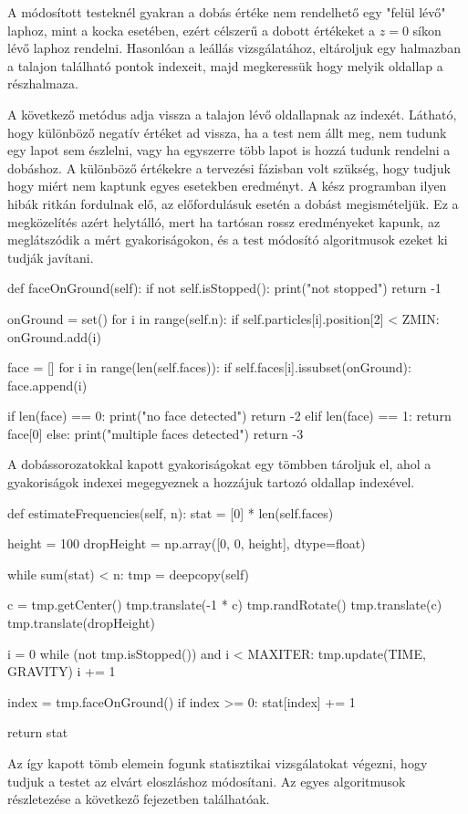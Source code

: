 
A módosított testeknél gyakran a dobás értéke nem rendelhető egy "felül lévő" laphoz, mint a kocka esetében, ezért célszerű a dobott értékeket a $z=0$ síkon lévő laphoz rendelni.
Hasonlóan a leállás vizsgálatához, eltároljuk egy halmazban a talajon található pontok indexeit, majd megkeressük hogy melyik oldallap a részhalmaza.

A következő metódus adja vissza a talajon lévő oldallapnak az indexét.
Látható, hogy különböző negatív értéket ad vissza, ha a test nem állt meg, nem tudunk egy lapot sem észlelni, vagy ha egyszerre több lapot is hozzá tudunk rendelni a dobáshoz.
A különböző értékekre a tervezési fázisban volt szükség, hogy tudjuk hogy miért nem kaptunk egyes esetekben eredményt.
A kész programban ilyen hibák ritkán fordulnak elő, az előfordulásuk esetén a dobást megismételjük.
Ez a megközelítés azért helytálló, mert ha tartósan rossz eredményeket kapunk, az meglátszódik a mért gyakoriságokon, és a test módosító algoritmusok ezeket ki tudják javítani.

\begin{python}
def faceOnGround(self):
    if not self.isStopped():
        print("not stopped")
        return -1

    onGround = set()
    for i in range(self.n):
        if self.particles[i].position[2] < ZMIN:
            onGround.add(i)

    face = []
    for i in range(len(self.faces)):
        if self.faces[i].issubset(onGround):
            face.append(i)

    if len(face) == 0:
        print("no face detected")
        return -2
    elif len(face) == 1:
        return face[0]
    else:
        print("multiple faces detected")
        return -3
\end{python}

A dobássorozatokkal kapott gyakoriságokat egy tömbben tároljuk el, ahol a gyakoriságok indexei megegyeznek a hozzájuk tartozó oldallap indexével.

\begin{python}
def estimateFrequencies(self, n):
    stat = [0] * len(self.faces)

    height = 100
    dropHeight = np.array([0, 0, height], dtype=float)

    while sum(stat) < n:
        tmp = deepcopy(self)

        c = tmp.getCenter()
        tmp.translate(-1 * c)
        tmp.randRotate()
        tmp.translate(c)
        tmp.translate(dropHeight)

        i = 0
        while (not tmp.isStopped()) and i < MAXITER:
            tmp.update(TIME, GRAVITY)
            i += 1

        index = tmp.faceOnGround()
        if index >= 0:
            stat[index] += 1

    return stat
\end{python}

Az így kapott tömb elemein fogunk statisztikai vizsgálatokat végezni, hogy tudjuk a testet az elvárt eloszláshoz módosítani.
Az egyes algoritmusok részletezése a következő fejezetben találhatóak.